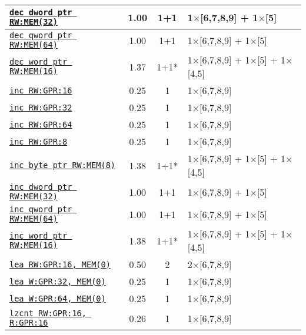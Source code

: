 \documentclass[a4paper,english,fontsize=9]{scrartcl}
\begin{document}
\begin{longtable}{p{}ccL{.25\textwidth}}
  \midrule
  \texttt{\href{https://felixcloutier.com/x86/DEC.html}{dec dword ptr RW:MEM(32)}} & 1.00 & 1+1 & 1\(\times\)[6,7,8,9] + 1\(\times\)[5] \\
  \midrule
  \texttt{\href{https://felixcloutier.com/x86/DEC.html}{dec qword ptr RW:MEM(64)}} & 1.00 & 1+1 & 1\(\times\)[6,7,8,9] + 1\(\times\)[5] \\
  \midrule
  \texttt{\href{https://felixcloutier.com/x86/DEC.html}{dec word ptr RW:MEM(16)}} & 1.37 & 1+1* & 1\(\times\)[6,7,8,9] + 1\(\times\)[5] + 1\(\times\)[4,5] \\
  \midrule
  \texttt{\href{https://felixcloutier.com/x86/INC.html}{inc RW:GPR:16}} & 0.25 & 1 & 1\(\times\)[6,7,8,9] \\
  \midrule
  \texttt{\href{https://felixcloutier.com/x86/INC.html}{inc RW:GPR:32}} & 0.25 & 1 & 1\(\times\)[6,7,8,9] \\
  \midrule
  \texttt{\href{https://felixcloutier.com/x86/INC.html}{inc RW:GPR:64}} & 0.25 & 1 & 1\(\times\)[6,7,8,9] \\
  \midrule
  \texttt{\href{https://felixcloutier.com/x86/INC.html}{inc RW:GPR:8}} & 0.25 & 1 & 1\(\times\)[6,7,8,9] \\
  \midrule
  \texttt{\href{https://felixcloutier.com/x86/INC.html}{inc byte ptr RW:MEM(8)}} & 1.38 & 1+1* & 1\(\times\)[6,7,8,9] + 1\(\times\)[5] + 1\(\times\)[4,5] \\
  \midrule
  \texttt{\href{https://felixcloutier.com/x86/INC.html}{inc dword ptr RW:MEM(32)}} & 1.00 & 1+1 & 1\(\times\)[6,7,8,9] + 1\(\times\)[5] \\
  \midrule
  \texttt{\href{https://felixcloutier.com/x86/INC.html}{inc qword ptr RW:MEM(64)}} & 1.00 & 1+1 & 1\(\times\)[6,7,8,9] + 1\(\times\)[5] \\
  \midrule
  \texttt{\href{https://felixcloutier.com/x86/INC.html}{inc word ptr RW:MEM(16)}} & 1.38 & 1+1* & 1\(\times\)[6,7,8,9] + 1\(\times\)[5] + 1\(\times\)[4,5] \\
  \midrule
  \texttt{\href{https://felixcloutier.com/x86/LEA.html}{lea RW:GPR:16, MEM(0)}} & 0.50 & 2 & 2\(\times\)[6,7,8,9] \\
  \midrule
  \texttt{\href{https://felixcloutier.com/x86/LEA.html}{lea W:GPR:32, MEM(0)}} & 0.25 & 1 & 1\(\times\)[6,7,8,9] \\
  \midrule
  \texttt{\href{https://felixcloutier.com/x86/LEA.html}{lea W:GPR:64, MEM(0)}} & 0.25 & 1 & 1\(\times\)[6,7,8,9] \\
  \midrule
  \texttt{\href{https://felixcloutier.com/x86/LZCNT.html}{lzcnt RW:GPR:16, R:GPR:16}} & 0.26 & 1 & 1\(\times\)[6,7,8,9] \\

\end{longtable}
\end{document}
